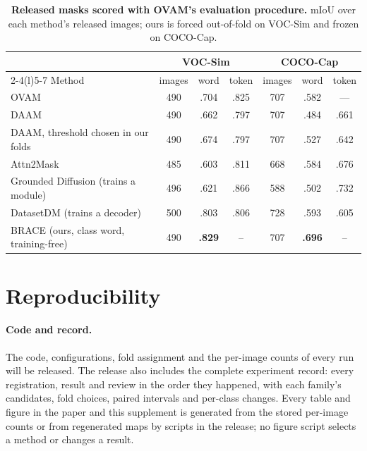 \documentclass[10pt,twocolumn,letterpaper]{article}
\begin{document}
\begin{table}[t]
\centering
\footnotesize\setlength{\tabcolsep}{4pt}
\begin{tabular}{@{}lcccccc@{}}
\toprule
& \multicolumn{3}{c}{VOC-Sim} & \multicolumn{3}{c}{COCO-Cap} \\
\cmidrule(lr){2-4}\cmidrule(l){5-7}
Method & images & word & token & images & word & token \\
\midrule
OVAM & 490 & .704 & .825 & 707 & .582 & --- \\
DAAM & 490 & .662 & .797 & 707 & .484 & .661 \\
DAAM, threshold chosen in our folds & 490 & .674 & .797 & 707 & .527 & .642 \\
Attn2Mask & 485 & .603 & .811 & 668 & .584 & .676 \\
Grounded Diffusion (trains a module) & 496 & .621 & .866 & 588 & .502 & .732 \\
DatasetDM (trains a decoder) & 500 & .803 & .806 & 728 & .593 & .605 \\
\midrule
BRACE (ours, class word, training-free) & 490 & \textbf{.829} & -- & 707 & \textbf{.696} & -- \\
\bottomrule
\end{tabular}
\caption{\textbf{Released masks scored with OVAM's evaluation procedure.} mIoU over each method's released images; ours is forced out-of-fold on VOC-Sim and frozen on COCO-Cap.}
\label{tab:s_released}
\end{table}

\section{Reproducibility}
\label{sec:s_repro}

\paragraph{Code and record.}
The code, configurations, fold assignment and the per-image counts of every run will be released. The release also includes the complete experiment record: every registration, result and review in the order they happened, with each family's candidates, fold choices, paired intervals and per-class changes. Every table and figure in the paper and this supplement is generated from the stored per-image counts or from regenerated maps by scripts in the release; no figure script selects a method or changes a result.
\end{document}
